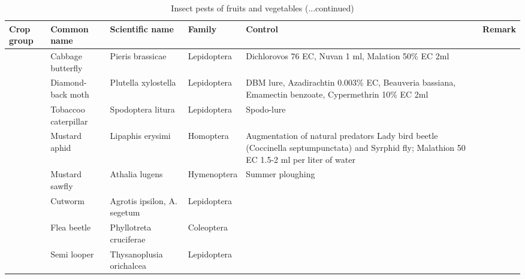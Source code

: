 \documentclass[10pt,dvipsnames,ignorenonframetext,aspectratio=169]{beamer}
\begin{document}
\begin{frame}{}
\protect\hypertarget{section-25}{}
\begin{table}

\caption{\label{tab:unnamed-chunk-7}Insect pests of fruits and vegetables (...continued)}
\centering
\fontsize{4}{6}\selectfont
\begin{tabular}[t]{>{\raggedright\arraybackslash}p{6em}>{\raggedright\arraybackslash}p{12em}>{\raggedright\arraybackslash}p{14em}>{\raggedright\arraybackslash}p{14em}>{\raggedright\arraybackslash}p{14em}>{\raggedright\arraybackslash}p{8em}}
\toprule
Crop group & Common name & Scientific name & Family & Control & Remark\\
\midrule
 & Cabbage butterfly & Pieris brassicae & Lepidoptera & Dichlorovos 76 EC, Nuvan 1 ml, Malation 50\% EC 2ml & \\
\cmidrule{2-6}
 & Diamond-back moth & Plutella xylostella & Lepidoptera & DBM lure, Azadirachtin 0.003\% EC, Beauveria bassiana, Emamectin benzoate, Cypermethrin 10\% EC 2ml & \\
\cmidrule{2-6}
 & Tobaccoo caterpillar & Spodoptera litura & Lepidoptera & Spodo-lure & \\
\cmidrule{2-6}
 & Mustard aphid & Lipaphis erysimi & Homoptera & Augmentation of natural predators Lady bird beetle (Coccinella septumpunctata) and Syrphid fly; Malathion 50 EC 1.5-2 ml per liter of water & \\
\cmidrule{2-6}
 & Mustard sawfly & Athalia lugens & Hymenoptera & Summer ploughing & \\
\cmidrule{2-6}
 & Cutworm & Agrotis ipsilon, A. segetum & Lepidoptera &  & \\
\cmidrule{2-6}
 & Flea beetle & Phyllotreta cruciferae & Coleoptera &  & \\
\cmidrule{2-6}
\multirow{-8}{6em}{\raggedright\arraybackslash Cruciferous vegetables} & Semi looper & Thysanoplusia orichalcea & Lepidoptera &  & \\
\bottomrule
\end{tabular}
\end{table}
\end{frame}
\end{document}
